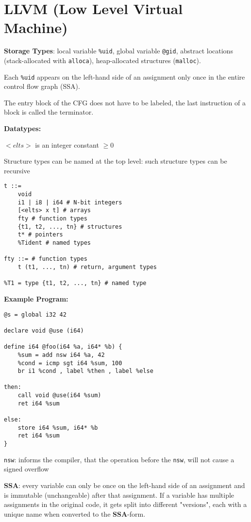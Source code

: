 \section*{LLVM (Low Level Virtual Machine)}

\textbf{Storage Types}: local variable \texttt{\%uid}, global variable \texttt{@gid}, abstract locations (stack-allocated with \texttt{alloca}), heap-allocated structures (\texttt{malloc}).\medskip

Each \texttt{\%uid} appears on the left-hand side of an assignment only once in the entire control flow graph (SSA).\medskip

The entry block of the CFG does not have to be labeled, the last instruction of a block is called the terminator. \medskip

\textbf{Datatypes:}
\begin{compactitem}
\item $<elts>$ is an integer constant $\geq 0$
\item Structure types can be named at the top level: such structure types can be recursive
\end{compactitem}
\begin{lstlisting}
t ::=
    void
    i1 | i8 | i64 # N-bit integers
    [<elts> x t] # arrays
    fty # function types
    {t1, t2, ..., tn} # structures
    t* # pointers
    %Tident # named types
    
fty ::= # function types
    t (t1, ..., tn) # return, argument types

%T1 = type {t1, t2, ..., tn} # named type
\end{lstlisting} \medskip

\textbf{Example Program:}
\begin{lstlisting}
@s = global i32 42

declare void @use (i64)

define i64 @foo(i64 %a, i64* %b) { 
	%sum = add nsw i64 %a, 42
	%cond = icmp sgt i64 %sum, 100
	br i1 %cond , label %then , label %else
	
then:
	call void @use(i64 %sum) 
	ret i64 %sum
	
else:
	store i64 %sum, i64* %b 
	ret i64 %sum
}
\end{lstlisting} \medskip

\texttt{nsw}: informs the compiler, that the operation before the \texttt{nsw}, will not cause a signed overflow

\textbf{SSA}: every variable can only be once on the left-hand side of an assignment and is immutable (unchangeable) after that assignment. If a variable has multiple assignments in the original code, it gets split into different "versions", each with a unique name when converted to the \textbf{SSA}-form.

